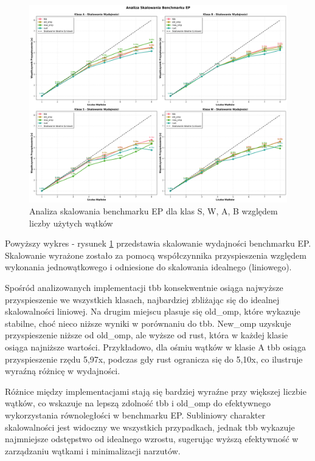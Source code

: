 \begin{figure}[H]
    \centering
    \includegraphics[width=\textwidth]{analiza/images/parallel/ep/arm/ep_analiza_skalowania.png}
    \caption{Analiza skalowania benchmarku EP dla klas S, W, A, B względem liczby użytych wątków}
    \label{ep_analiza_skalowania}
\end{figure}
Powyższy wykres - rysunek \ref{ep_analiza_skalowania} przedstawia skalowanie wydajności benchmarku EP. Skalowanie wyrażone zostało za pomocą współczynnika przyspieszenia względem wykonania jednowątkowego i odniesione do skalowania idealnego (liniowego).

Spośród analizowanych implementacji tbb konsekwentnie osiąga najwyższe przyspieszenie we wszystkich klasach, najbardziej zbliżając się do idealnej skalowalności liniowej. Na drugim miejscu plasuje się old\_omp, które wykazuje stabilne, choć nieco niższe wyniki w porównaniu do tbb. New\_omp uzyskuje przyspieszenie niższe od old\_omp, ale wyższe od rust, która w każdej klasie osiąga najniższe wartości. Przykładowo, dla ośmiu wątków w klasie A tbb osiąga przyspieszenie rzędu 5,97x, podczas gdy rust ogranicza się do 5,10x, co ilustruje wyraźną różnicę w wydajności.

Różnice między implementacjami stają się bardziej wyraźne przy większej liczbie wątków, co wskazuje na lepszą zdolność tbb i old\_omp do efektywnego wykorzystania równoległości w benchmarku EP. Subliniowy charakter skalowalności jest widoczny we wszystkich przypadkach, jednak tbb wykazuje najmniejsze odstępstwo od idealnego wzrostu, sugerując wyższą efektywność w zarządzaniu wątkami i minimalizacji narzutów.

